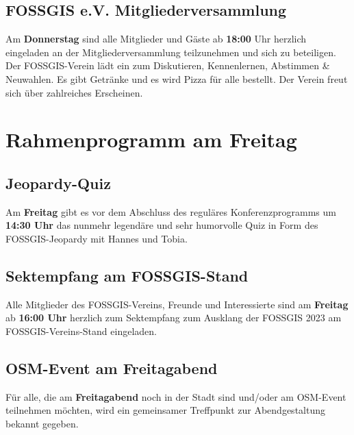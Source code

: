 \subsection*{FOSSGIS e.V. Mitgliederversammlung}
Am {\bfseries Donnerstag} sind alle Mitglieder und Gäste ab {\bfseries 18:00} Uhr herzlich eingeladen an der Mitgliederversammlung teilzunehmen und sich zu beteiligen. Der FOSSGIS-Verein lädt ein zum Diskutieren, Kennenlernen, Abstimmen \& Neuwahlen. Es gibt Getränke und es wird Pizza für alle bestellt. Der Verein freut sich über zahlreiches Erscheinen.

\section*{Rahmenprogramm am Freitag}
\subsection*{Jeopardy-Quiz}
Am {\bfseries Freitag} gibt es vor dem Abschluss des reguläres Konferenzprogramms um {\bfseries 14:30 Uhr} das nunmehr legendäre und sehr humorvolle Quiz in Form des FOSSGIS-Jeopardy mit Hannes und Tobia.

\subsection*{Sektempfang am FOSSGIS-Stand}
Alle Mitglieder des FOSSGIS-Vereins, Freunde und Interessierte sind am {\bfseries Freitag} ab {\bfseries 16:00 Uhr} herzlich zum Sektempfang zum Ausklang der FOSSGIS 2023 am FOSSGIS-Vereins-Stand eingeladen.

\subsection*{OSM-Event am Freitagabend}
Für alle, die am {\bfseries Freitagabend} noch in der Stadt sind und/oder am OSM-Event teilnehmen möchten, wird ein gemeinsamer Treffpunkt zur Abendgestaltung bekannt gegeben.

\newpage
\label{platinsposoren}

\newpage

\newpage

\newpage

\newpage

\newpage

